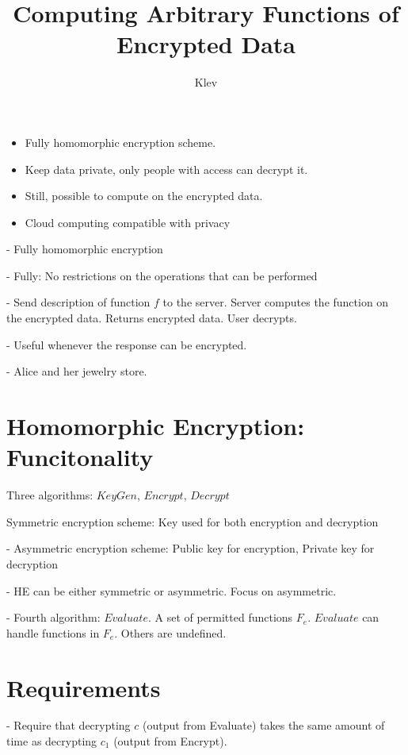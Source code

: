 \documentclass[10pt]{article}
\begin{document}
\author{Klev}
\title{Computing Arbitrary Functions of Encrypted Data}
\maketitle

\begin{itemize}
	\item Fully homomorphic encryption scheme.
	\item Keep data private, only people with access can decrypt it.
	\item Still, possible to compute on the encrypted data.
	\item Cloud computing compatible with privacy
\end{itemize}

- Fully homomorphic encryption

- Fully: No restrictions on the operations that can be performed

- Send description of function $f$ to the server. Server computes the function on the encrypted data. Returns encrypted data. User decrypts.

- Useful whenever the response can be encrypted.

- Alice and her jewelry store.\\

\section{Homomorphic Encryption: Funcitonality}

Three algorithms: $KeyGen$, $Encrypt$, $Decrypt$


Symmetric encryption scheme: Key used for both encryption and decryption

- Asymmetric encryption scheme: Public key for encryption, Private key for decryption

- HE can be either symmetric or asymmetric. Focus on asymmetric.

- Fourth algorithm: $Evaluate$. A set of permitted functions $F_e$. $Evaluate$ can handle functions in $F_e$. Others are undefined.\\

\section{Requirements}

- Require that decrypting $c$ (output from Evaluate) takes the same amount of time as decrypting $c_1$ (output from Encrypt).
\end{document}
